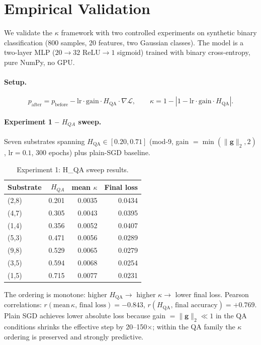 \documentclass[11pt]{article}
\theoremstyle{definition}
\theoremstyle{remark}
\newcommand{\hqa}{H_{\mathrm{QA}}}
\begin{document}
\section{Empirical Validation}
\label{sec:empirical}

We validate the $\kappa$ framework with two controlled experiments on synthetic
binary classification (800 samples, 20 features, two Gaussian classes). The model is
a two-layer MLP ($20\to32$ ReLU$\to1$ sigmoid) trained with binary cross-entropy,
pure NumPy, no GPU.

\paragraph{Setup.}
\[
  p_{\mathrm{after}} = p_{\mathrm{before}}
    - \mathrm{lr}\cdot\mathrm{gain}\cdot\hqa\cdot\nabla\mathcal{L},
  \qquad
  \kappa = 1-|1-\mathrm{lr}\cdot\mathrm{gain}\cdot\hqa|.
\]

\paragraph{Experiment 1 -- $H_{QA}$ sweep.}
Seven substrates spanning $\hqa\in[0.20,0.71]$ (mod-9, gain $=\min(\|\mathbf{g}\|_2,2)$,
$\mathrm{lr}=0.1$, 300 epochs) plus plain-SGD baseline.

\begin{table}[h]
\centering
\caption{Experiment 1: H\_QA sweep results.}
\begin{tabular}{lrrr}
\toprule
Substrate & $H_{QA}$ & mean $\kappa$ & Final loss \\
\midrule
(2,8) & 0.201 & 0.0035 & 0.0434 \\
(4,7) & 0.305 & 0.0043 & 0.0395 \\
(1,4) & 0.356 & 0.0052 & 0.0407 \\
(5,3) & 0.471 & 0.0056 & 0.0289 \\
(9,8) & 0.529 & 0.0065 & 0.0279 \\
(3,5) & 0.594 & 0.0068 & 0.0254 \\
(1,5) & 0.715 & 0.0077 & 0.0231 \\
\bottomrule
\end{tabular}
\end{table}

The ordering is monotone: higher $\hqa\to$ higher $\kappa\to$ lower final loss.
Pearson correlations: $r(\text{mean}\,\kappa,\,\text{final loss})=-0.843$,
$r(\hqa,\,\text{final accuracy})=+0.769$. Plain SGD achieves lower absolute loss
because gain $=\|\mathbf{g}\|_2\ll 1$ in the QA conditions shrinks the effective
step by 20--150$\times$; within the QA family the $\kappa$ ordering is preserved
and strongly predictive.
\end{document}
